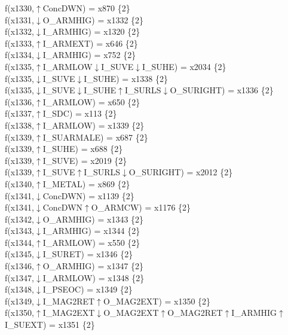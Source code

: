 f(x1330,$\uparrow$ConcDWN) = x870 \{2\} \\  
f(x1331,$\downarrow$O\_ARMHIG) = x1332 \{2\} \\  
f(x1332,$\downarrow$I\_ARMHIG) = x1320 \{2\} \\  
f(x1333,$\uparrow$I\_ARMEXT) = x646 \{2\} \\  
f(x1334,$\downarrow$I\_ARMHIG) = x752 \{2\} \\  
f(x1335,$\uparrow$I\_ARMLOW$\downarrow$I\_SUVE$\downarrow$I\_SUHE) = x2034 \{2\} \\  
f(x1335,$\downarrow$I\_SUVE$\downarrow$I\_SUHE) = x1338 \{2\} \\  
f(x1335,$\downarrow$I\_SUVE$\downarrow$I\_SUHE$\uparrow$I\_SURLS$\downarrow$O\_SURIGHT) = x1336 \{2\} \\  
f(x1336,$\uparrow$I\_ARMLOW) = x650 \{2\} \\  
f(x1337,$\uparrow$I\_SDC) = x113 \{2\} \\  
f(x1338,$\uparrow$I\_ARMLOW) = x1339 \{2\} \\  
f(x1339,$\uparrow$I\_SUARMALE) = x687 \{2\} \\  
f(x1339,$\uparrow$I\_SUHE) = x688 \{2\} \\  
f(x1339,$\uparrow$I\_SUVE) = x2019 \{2\} \\  
f(x1339,$\uparrow$I\_SUVE$\uparrow$I\_SURLS$\downarrow$O\_SURIGHT) = x2012 \{2\} \\  
f(x1340,$\uparrow$I\_METAL) = x869 \{2\} \\  
f(x1341,$\downarrow$ConcDWN) = x1139 \{2\} \\  
f(x1341,$\downarrow$ConcDWN$\uparrow$O\_ARMCW) = x1176 \{2\} \\  
f(x1342,$\downarrow$O\_ARMHIG) = x1343 \{2\} \\  
f(x1343,$\downarrow$I\_ARMHIG) = x1344 \{2\} \\  
f(x1344,$\uparrow$I\_ARMLOW) = x550 \{2\} \\  
f(x1345,$\downarrow$I\_SURET) = x1346 \{2\} \\  
f(x1346,$\uparrow$O\_ARMHIG) = x1347 \{2\} \\  
f(x1347,$\downarrow$I\_ARMLOW) = x1348 \{2\} \\  
f(x1348,$\downarrow$I\_PSEOC) = x1349 \{2\} \\  
f(x1349,$\downarrow$I\_MAG2RET$\uparrow$O\_MAG2EXT) = x1350 \{2\} \\  
f(x1350,$\uparrow$I\_MAG2EXT$\downarrow$O\_MAG2EXT$\uparrow$O\_MAG2RET$\uparrow$I\_ARMHIG$\uparrow$I\_SUEXT) = x1351 \{2\} \\  
